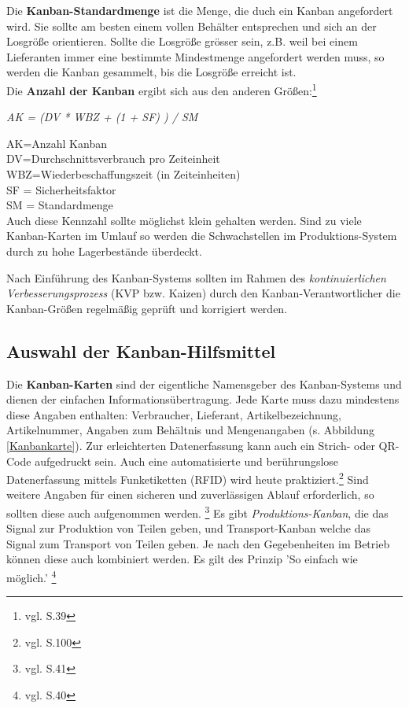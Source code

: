Die \textbf{Kanban-Standardmenge} ist die Menge, die duch ein Kanban angefordert wird.
Sie sollte am besten einem vollen Behälter entsprechen und sich an der Losgröße orientieren.
Sollte die Losgröße grösser sein, z.B. weil bei einem Lieferanten immer eine bestimmte Mindestmenge angefordert werden muss, 
so werden die Kanban gesammelt, bis die Losgröße erreicht ist.\\

Die \textbf{Anzahl der Kanban} ergibt sich aus den anderen Größen:\footnote{vgl. \cite{Geiger2011Kanban} S.39}

\centerline{\textit{AK = (DV * WBZ + (1 + SF) ) / SM}}

 AK=Anzahl Kanban\\
 DV=Durchschnittsverbrauch pro Zeiteinheit\\
 WBZ=Wiederbeschaffungszeit (in Zeiteinheiten)\\
 SF = Sicherheitsfaktor\\
 SM = Standardmenge\\
Auch diese Kennzahl sollte möglichst klein gehalten werden. Sind zu viele Kanban-Karten im Umlauf so 
werden die Schwachstellen im Produktions-System durch zu hohe Lagerbestände überdeckt.

Nach Einführung des Kanban-Systems sollten im Rahmen des \textit{kontinuierlichen Verbesserungsprozess} (KVP bzw. Kaizen) 
durch den Kanban-Verantwortlicher die Kanban-Größen regelmäßig geprüft und korrigiert werden. 

\subsection{Auswahl der Kanban-Hilfsmittel}
Die \textbf{Kanban-Karten} sind der eigentliche Namensgeber des Kanban-Systems und dienen der einfachen Informationsübertragung.
Jede Karte muss dazu mindestens diese Angaben enthalten: Verbraucher, Lieferant, Artikelbezeichnung, Artikelnummer, 
Angaben zum Behältnis und Mengenangaben (s. Abbildung \ref{Kanbankarte}). 
Zur erleichterten Datenerfassung kann auch ein Strich- oder QR-Code aufgedruckt sein.
Auch eine automatisierte und berührungslose Datenerfassung mittels Funketiketten (RFID) wird heute praktiziert.\footnote{vgl. \cite{Weber2014KE} S.100}
Sind weitere Angaben für einen sicheren und zuverlässigen Ablauf erforderlich, so sollten diese auch aufgenommen werden.
\footnote{vgl. \cite{Geiger2011Kanban} S.41}
Es gibt \textit{Produktions-Kanban}, die das Signal zur Produktion von Teilen geben, 
und Transport-Kanban welche das Signal zum Transport von Teilen geben.
Je nach den Gegebenheiten im Betrieb können diese auch kombiniert werden. Es gilt des Prinzip 'So einfach wie möglich.'
\footnote{vgl. \cite{Geiger2011Kanban} S.40}

